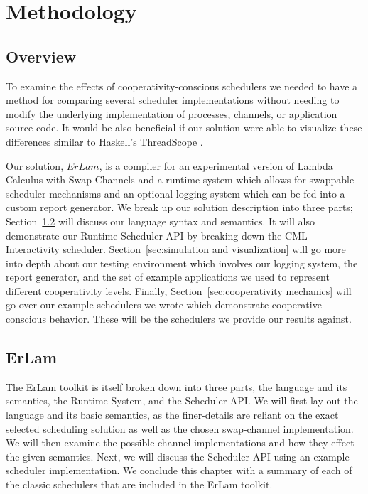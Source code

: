 \chapter{Methodology}
%
\label{chap:methodology}

\section{Overview}\label{sec:method overview}

To examine the effects of cooperativity-conscious schedulers we needed to have 
a method for comparing several scheduler implementations without needing to 
modify the underlying implementation of processes, channels, or application
source code. It would be also beneficial if our solution were able to visualize
these differences similar to Haskell's ThreadScope \cite{jones2009parallel}.

Our solution, $ErLam$, is a compiler for an experimental version of Lambda 
Calculus with Swap Channels and a runtime system which allows for swappable 
scheduler mechanisms and an optional logging system which can be fed into a 
custom report generator.
We break up our solution description into three parts; 
Section~\ref{sec:erlam}
will discuss our language syntax and semantics. It will also demonstrate our
Runtime Scheduler API by breaking down the CML Interactivity scheduler. 
Section~\ref{sec:simulation and visualization} 
will go more into depth about
our testing environment which involves our logging system, the report generator,
and the set of example applications we used to represent different cooperativity
levels. 
Finally, Section~\ref{sec:cooperativity mechanics} will go over our
example schedulers we wrote which demonstrate cooperative-conscious behavior. 
These will be the schedulers we provide our results against.

\section{ErLam}\label{sec:erlam}

The ErLam toolkit is itself broken down into three parts, the language and its
semantics, the Runtime System, and the Scheduler API. We will first lay out the
language and its basic semantics, as the finer-details are reliant on the exact
selected scheduling solution as well as the chosen swap-channel implementation.
We will then examine the possible channel implementations and how they effect
the given semantics. Next, we will discuss the Scheduler API using an example
scheduler implementation. We conclude this chapter with a summary of each of the 
classic schedulers that are included in the ErLam toolkit.


